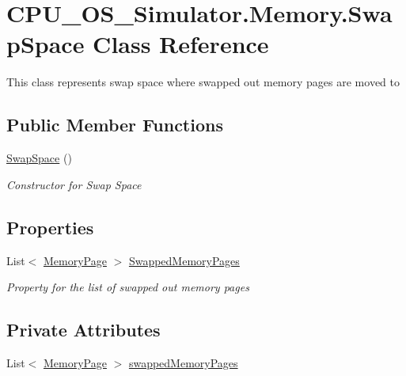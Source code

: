 \hypertarget{class_c_p_u___o_s___simulator_1_1_memory_1_1_swap_space}{}\section{C\+P\+U\+\_\+\+O\+S\+\_\+\+Simulator.\+Memory.\+Swap\+Space Class Reference}
\label{class_c_p_u___o_s___simulator_1_1_memory_1_1_swap_space}


This class represents swap space where swapped out memory pages are moved to  


\subsection*{Public Member Functions}
\begin{DoxyCompactItemize}
\item 
\hyperlink{class_c_p_u___o_s___simulator_1_1_memory_1_1_swap_space_ad4394dbf2d5a0c95bbabc94948ed37e5}{Swap\+Space} ()
\begin{DoxyCompactList}\small\item\em Constructor for Swap Space \end{DoxyCompactList}\end{DoxyCompactItemize}
\subsection*{Properties}
\begin{DoxyCompactItemize}
\item 
List$<$ \hyperlink{class_c_p_u___o_s___simulator_1_1_memory_1_1_memory_page}{Memory\+Page} $>$ \hyperlink{class_c_p_u___o_s___simulator_1_1_memory_1_1_swap_space_a83c049a398bcff3c29f809b02ed3f782}{Swapped\+Memory\+Pages}
\begin{DoxyCompactList}\small\item\em Property for the list of swapped out memory pages \end{DoxyCompactList}\end{DoxyCompactItemize}
\subsection*{Private Attributes}
\begin{DoxyCompactItemize}
\item 
List$<$ \hyperlink{class_c_p_u___o_s___simulator_1_1_memory_1_1_memory_page}{Memory\+Page} $>$ \hyperlink{class_c_p_u___o_s___simulator_1_1_memory_1_1_swap_space_ad991c315222ab7bf7fafd562d6fe8014}{swapped\+Memory\+Pages}
\end{DoxyCompactItemize}


